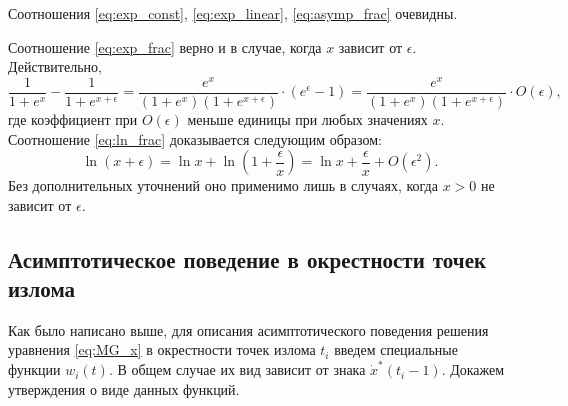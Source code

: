Соотношения \eqref{eq:exp_const}, \eqref{eq:exp_linear}, \eqref{eq:asymp_frac} очевидны.

Соотношение \eqref{eq:exp_frac} верно и в случае, когда $x$ зависит от $\epsilon$. Действительно,
%
\[
\dfrac{1}{1 + e^x} - \dfrac{1}{1 + e^{x + \epsilon}} = \dfrac{e^x}{(1 + e^x)(1 + e^{x + \epsilon})} \cdot (e^{\epsilon} - 1) = \dfrac{e^x}{(1 + e^x)(1 + e^{x + \epsilon})} \cdot O(\epsilon),
\]
где коэффициент при $O(\epsilon)$ меньше единицы при любых значениях $x$.
%
Соотношение \eqref{eq:ln_frac} доказывается следующим образом:
\[
\ln(x + \epsilon) = \ln x + \ln\left(1 + \frac{\epsilon}{x}\right) = \ln x + \frac{\epsilon}{x} + O(\epsilon^2).
\]
Без дополнительных уточнений оно применимо лишь в случаях, когда $x > 0$ не зависит от $\epsilon$.

\subsection{Асимптотическое поведение в окрестности точек излома}
\label{subsect:ch1:w_func}

Как было написано выше, для описания асимптотического поведения решения уравнения \eqref{eq:MG_x} в окрестности точек излома $t_i$ введем специальные функции $w_i(t)$. В общем случае их вид зависит от знака $\dot{x}^*(t_i - 1)$. Докажем утверждения о виде данных функций.

